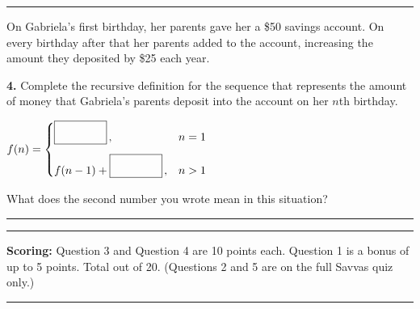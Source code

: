 \documentclass[11pt]{article}
\newcommand{\answerbox}{\fbox{\rule{0pt}{14pt}\hspace{1.4cm}}}
\begin{document}
\vspace{10pt}\noindent\rule{\textwidth}{0.4pt}

\vspace{6pt}
On Gabriela's first birthday, her parents gave her a \$50 savings account. On every birthday after that her parents added to the account, increasing the amount they deposited by \$25 each year.

\vspace{4pt}
\textbf{4.} Complete the recursive definition for the sequence that represents the amount of money that Gabriela's parents deposit into the account on her $n$th birthday.

\vspace{8pt}
\hspace{1.5cm}$f(n)=\begin{cases}\answerbox\,, & n=1\\[8pt] f(n-1)+\answerbox\,, & n>1\end{cases}$

\vspace{10pt}
What does the second number you wrote mean in this situation?

\vspace{4pt}\rule{\linewidth}{0.4pt}

\vspace{10pt}\rule{\linewidth}{0.4pt}

\vfill
\noindent\textbf{Scoring:} Question 3 and Question 4 are 10 points each. Question 1 is a bonus of up to 5 points. Total out of 20. (Questions 2 and 5 are on the full Savvas quiz only.)

\newpage
{}

\vspace{4pt}\noindent\rule{\textwidth}{0.6pt}
\end{document}
